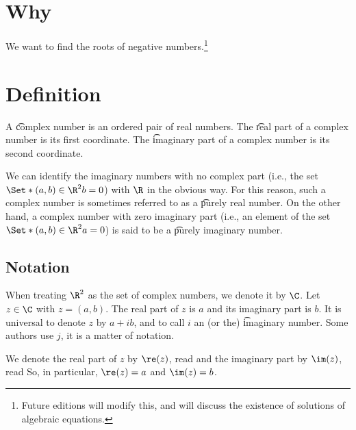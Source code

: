 

\section*{Why}

We want to find the roots of negative numbers.\footnote{Future editions will modify this, and will discuss the existence of solutions of algebraic equations.}

\section*{Definition}

A \t{complex number} is an ordered pair of real numbers.
The \t{real part} of a complex number is its first coordinate.
The \t{imaginary part} of a complex number is its second coordinate.

We can identify the imaginary numbers with no complex part (i.e., the set $\Set*{(a, b) \in \R ^2}{b = 0}$) with $\R $ in the obvious way.
For this reason, such a complex number is sometimes referred to as a \t{purely real number}.
On the other hand, a complex number with zero imaginary part (i.e., an element of the set $\Set*{(a, b) \in \R ^2}{a = 0}$) is said to be a \t{purely imaginary number}.

\subsection*{Notation}

When treating $\R ^2$ as the set of complex numbers, we denote it by $\C $.
Let $z \in \C $ with $z = (a, b)$.
The real part of $z$ is $a$ and its imaginary part is $b$.
It is universal to denote $z$ by $a + ib$, and to call $i$ an (or the) \t{imaginary number}.
Some authors use $j$, it is a matter of notation.

We denote the real part of $z$ by $\re(z)$, read  and the imaginary part by $\im(z)$, read 
So, in particular, $\re(z) = a$ and $\im(z) = b$.

\blankpage